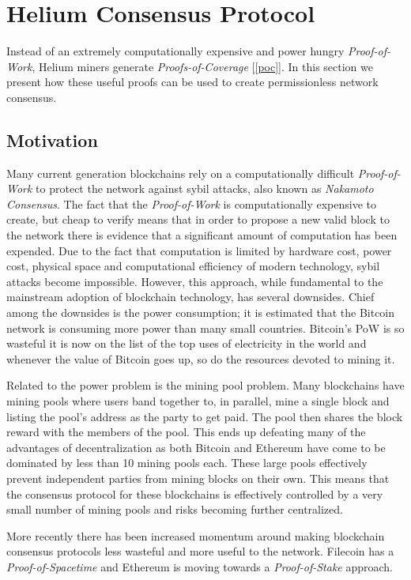 \documentclass[10pt, nonatbib, nocopyrightspace, reprint]{sigplanconf}
\newcommand{\secref}[1]{[\autoref{#1}]}
\begin{document}
\section{Helium Consensus Protocol}\label{consensus}

Instead of an extremely computationally expensive and power hungry \emph{Proof-of-Work}, Helium miners generate \emph{Proofs-of-Coverage} \secref{poc}. In this section we present how these useful proofs can be used to create permissionless network consensus.

\subsection{Motivation}

Many current generation blockchains rely on a computationally difficult \emph{Proof-of-Work} to protect the network against sybil attacks, also known as \emph{Nakamoto Consensus}. The fact that the \emph{Proof-of-Work} is computationally expensive to create, but cheap to verify means that in order to propose a new valid block to the network there is evidence that a significant amount of computation has been expended. Due to the fact that computation is limited by hardware cost, power cost, physical space and computational efficiency of modern technology, sybil attacks become impossible. However, this approach, while fundamental to the mainstream adoption of blockchain technology, has several downsides. Chief among the downsides is the power consumption; it is estimated that the Bitcoin network is consuming more power than many small countries. Bitcoin's PoW is so wasteful it is now on the list of the top uses of electricity in the world and whenever the value of Bitcoin goes up, so do the resources devoted to mining it.

Related to the power problem is the mining pool problem. Many blockchains have mining pools where users band together to, in parallel, mine a single block and listing the pool's address as the party to get paid. The pool then shares the block reward with the members of the pool. This ends up defeating many of the advantages of decentralization as both Bitcoin and Ethereum have come to be dominated by less than 10 mining pools each. These large pools effectively prevent independent parties from mining blocks on their own. This means that the consensus protocol for these blockchains is effectively controlled by a very small number of mining pools and risks becoming further centralized.

More recently there has been increased momentum around making blockchain consensus protocols less wasteful and more useful to the network. Filecoin \cite{filecoin} has a \emph{Proof-of-Spacetime} and Ethereum \cite{ethereum} is moving towards a \emph{Proof-of-Stake} \cite{pos} approach.
\end{document}
